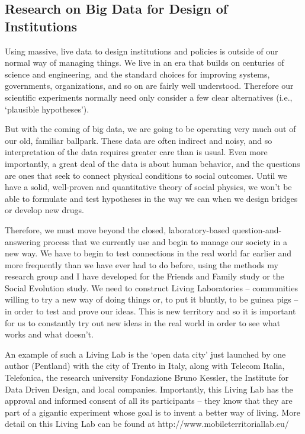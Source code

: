 \subsection{Research on Big Data for Design of Institutions}

Using massive, live data to design institutions and policies is outside of our normal way of managing things. We live in an era that builds on centuries of science and engineering, and the standard choices for improving systems, governments, organizations, and so on are fairly well understood. Therefore our scientific experiments normally need only consider a few clear alternatives (i.e., ‘plausible hypotheses’).

But with the coming of big data, we are going to be operating very much out of our old, familiar ballpark. These data are often indirect and noisy, and so interpretation of the data requires greater care than is usual. Even more importantly, a great deal of the data is about human behavior, and the questions are ones that seek to connect physical conditions to social outcomes. Until we have a solid, well-proven and quantitative theory of social physics, we won’t be able to formulate and test hypotheses in the way we can when we design bridges or develop new drugs.

Therefore, we must move beyond the closed, laboratory-based question-and-answering process that we currently use and begin to manage our society in a new way. We have to begin to test connections in the real world far earlier and more frequently than we have ever had to do before, using the methods my research group and I have developed for the Friends and Family study or the Social Evolution study. We need to construct Living Laboratories – communities willing to try a new way of doing things or, to put it bluntly, to be guinea pigs – in order to test and prove our ideas. This is new territory and so it is important for us to constantly try out new ideas in the real world in order to see what works and what doesn’t.

An example of such a Living Lab is the `open data city’ just launched by one author (Pentland) with the city of Trento in Italy, along with Telecom Italia, Telefonica, the research university Fondazione Bruno Kessler, the Institute for Data Driven Design, and local companies. Importantly, this Living Lab has the approval and informed consent of all its participants – they know that they are part of a gigantic experiment whose goal is to invent a better way of living. More detail on this Living Lab can be found at http://www.mobileterritoriallab.eu/

